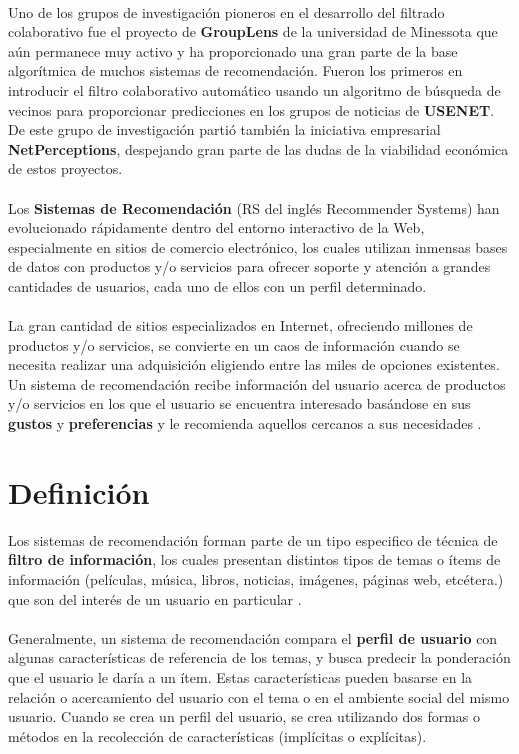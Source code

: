 \documentclass[12pt,letterpaper,oneside] {memoir}
\begin{document}
\paragraph{}
Uno de los grupos de investigación pioneros en el desarrollo del filtrado colaborativo fue el proyecto de \textbf{GroupLens} de la universidad de Minessota que aún permanece muy activo y ha proporcionado una gran parte de la base algorítmica de muchos sistemas de recomendación. Fueron los primeros en introducir  el filtro colaborativo automático usando un algoritmo de búsqueda de vecinos para proporcionar predicciones en los grupos de noticias de \textbf{USENET}. De este grupo de investigación partió también la iniciativa empresarial \textbf{NetPerceptions}, despejando gran parte de las dudas de la viabilidad económica de estos proyectos.
\paragraph{} 
Los \textbf{Sistemas de Recomendación} (RS del inglés Recommender Systems) han evolucionado rápidamente dentro del entorno interactivo de la Web, especialmente en sitios de comercio electrónico, los cuales utilizan inmensas bases de datos con productos y/o servicios para ofrecer soporte y atención a grandes cantidades de usuarios, cada uno de ellos con un perfil determinado.
\paragraph{}
La gran cantidad de sitios especializados en Internet, ofreciendo millones de productos y/o servicios, se convierte en un caos de información cuando se necesita realizar una adquisición eligiendo entre las miles de opciones existentes. Un sistema de recomendación recibe información del usuario acerca de productos y/o servicios en los que el usuario se encuentra interesado basándose en sus \textbf{gustos} y \textbf{preferencias} y le recomienda aquellos cercanos a sus necesidades \citep{GarciaGil2007}. 

\section{Definición}
Los sistemas de recomendación forman parte de un tipo especifico de técnica de \textbf{filtro de información}, los cuales presentan distintos tipos de temas o ítems de información (películas, música, libros, noticias, imágenes, páginas web, etcétera.) que son del interés de un usuario en particular \citep{wikipedia}. 
\paragraph{}
Generalmente, un sistema de recomendación compara el \textbf{perfil de usuario} con algunas características de referencia de los temas, y busca predecir la ponderación que el usuario le daría a un ítem. Estas características pueden basarse en la relación o acercamiento del usuario con el tema o en el ambiente social del mismo usuario. Cuando se crea un perfil del usuario, se crea utilizando dos formas o métodos en la recolección de características (implícitas o explícitas).
\end{document}
